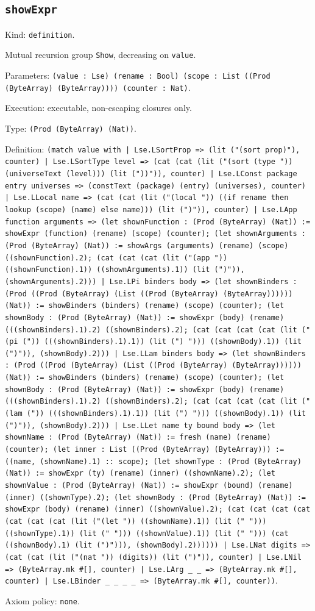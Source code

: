 \documentclass[11pt]{article}
\begin{document}
\subsection*{\texttt{showExpr}}
\noindent Kind: \texttt{definition}.\par
\noindent Mutual recursion group \texttt{Show}, decreasing on \texttt{value}.\par
\noindent Parameters: \texttt{(value : Lse) (rename : Bool) (scope : List ((Prod (ByteArray) (ByteArray)))) (counter : Nat)}.\par
\noindent Execution: executable, non-escaping closures only.\par
\noindent Type: \texttt{(Prod (ByteArray) (Nat))}.\par
\noindent Definition: \texttt{(match value with | Lse.LSortProp => (lit ("(sort prop)"), counter) | Lse.LSortType level => (cat (cat (lit ("(sort (type ")) (universeText (level))) (lit ("))")), counter) | Lse.LConst package entry universes => (constText (package) (entry) (universes), counter) | Lse.LLocal name => (cat (cat (lit ("(local ")) ((if rename then lookup (scope) (name) else name))) (lit (")")), counter) | Lse.LApp function arguments => (let shownFunction : (Prod (ByteArray) (Nat)) := showExpr (function) (rename) (scope) (counter); (let shownArguments : (Prod (ByteArray) (Nat)) := showArgs (arguments) (rename) (scope) ((shownFunction).2); (cat (cat (cat (lit ("(app ")) ((shownFunction).1)) ((shownArguments).1)) (lit (")")), (shownArguments).2))) | Lse.LPi binders body => (let shownBinders : (Prod ((Prod (ByteArray) (List ((Prod (ByteArray) (ByteArray)))))) (Nat)) := showBinders (binders) (rename) (scope) (counter); (let shownBody : (Prod (ByteArray) (Nat)) := showExpr (body) (rename) (((shownBinders).1).2) ((shownBinders).2); (cat (cat (cat (cat (lit ("(pi (")) (((shownBinders).1).1)) (lit (") "))) ((shownBody).1)) (lit (")")), (shownBody).2))) | Lse.LLam binders body => (let shownBinders : (Prod ((Prod (ByteArray) (List ((Prod (ByteArray) (ByteArray)))))) (Nat)) := showBinders (binders) (rename) (scope) (counter); (let shownBody : (Prod (ByteArray) (Nat)) := showExpr (body) (rename) (((shownBinders).1).2) ((shownBinders).2); (cat (cat (cat (cat (lit ("(lam (")) (((shownBinders).1).1)) (lit (") "))) ((shownBody).1)) (lit (")")), (shownBody).2))) | Lse.LLet name ty bound body => (let shownName : (Prod (ByteArray) (Nat)) := fresh (name) (rename) (counter); (let inner : List ((Prod (ByteArray) (ByteArray))) := ((name, (shownName).1) :: scope); (let shownType : (Prod (ByteArray) (Nat)) := showExpr (ty) (rename) (inner) ((shownName).2); (let shownValue : (Prod (ByteArray) (Nat)) := showExpr (bound) (rename) (inner) ((shownType).2); (let shownBody : (Prod (ByteArray) (Nat)) := showExpr (body) (rename) (inner) ((shownValue).2); (cat (cat (cat (cat (cat (cat (cat (lit ("(let ")) ((shownName).1)) (lit (" "))) ((shownType).1)) (lit (" "))) ((shownValue).1)) (lit (" "))) (cat ((shownBody).1) (lit (")"))), (shownBody).2)))))) | Lse.LNat digits => (cat (cat (lit ("(nat ")) (digits)) (lit (")")), counter) | Lse.LNil => (ByteArray.mk \#[], counter) | Lse.LArg \_ \_ => (ByteArray.mk \#[], counter) | Lse.LBinder \_ \_ \_ \_ => (ByteArray.mk \#[], counter))}.\par
\noindent Axiom policy: \texttt{none}.\par
\end{document}
